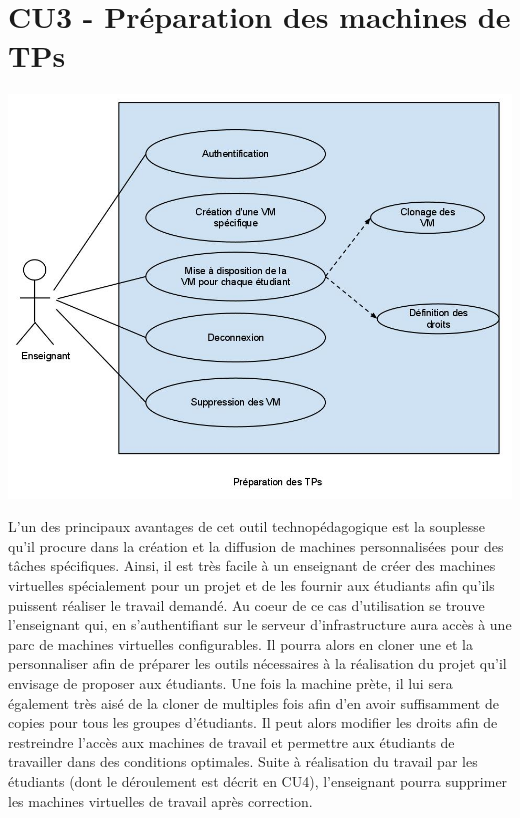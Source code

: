 \section{CU3 - Préparation des machines de TPs}

\includegraphics[scale=0.4]{CU3.jpg}

L’un des principaux avantages de cet outil technopédagogique est la souplesse qu’il procure dans la création et la diffusion de machines personnalisées pour des tâches spécifiques. Ainsi, il est très facile à un enseignant de créer des machines virtuelles spécialement pour un projet et de les fournir aux étudiants afin qu’ils puissent réaliser le travail demandé.
Au coeur de ce cas d’utilisation se trouve l’enseignant qui, en s’authentifiant sur le serveur d’infrastructure aura accès à une parc de machines virtuelles configurables. Il pourra alors en cloner une et la personnaliser afin de préparer les outils nécessaires à la réalisation du projet qu’il envisage de proposer aux étudiants. Une fois la machine prète, il lui sera également très aisé de la cloner de multiples fois afin d’en avoir suffisamment de copies pour tous les groupes d’étudiants. Il peut alors modifier les droits afin de restreindre l’accès aux machines de travail et permettre aux étudiants de travailler dans des conditions optimales. Suite à réalisation du travail par les étudiants (dont le déroulement est décrit en CU4), l’enseignant pourra supprimer les machines virtuelles de travail après correction.
